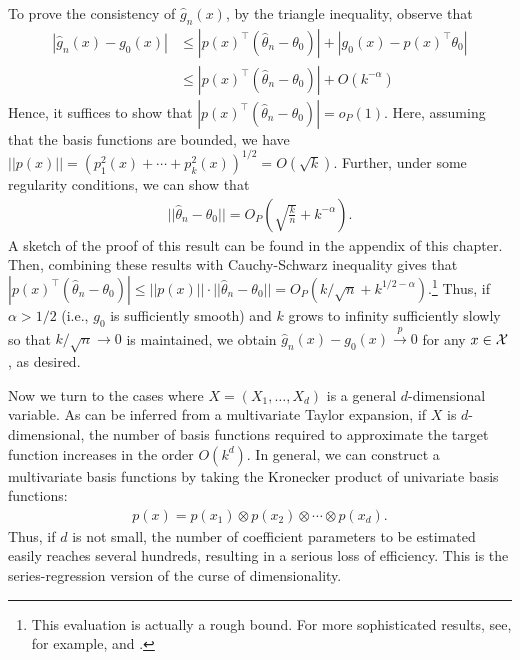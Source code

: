\documentclass[11pt, A4paper, openany, uplatex]{book}
\begin{document}
To prove the consistency of $\hat g_n(x)$, by the triangle inequality, observe that
\begin{align*}
	|\hat g_n(x) - g_0(x)|
	& \le |p(x)^\top (\hat \theta_n - \theta_0)| + |g_0(x) - p(x)^\top \theta_0| \\
	& \le |p(x)^\top (\hat \theta_n - \theta_0)| + O(k^{-\alpha})
\end{align*}
Hence, it suffices to show that $|p(x)^\top (\hat \theta_n - \theta_0)| = o_P(1)$.
Here, assuming that the basis functions are bounded, we have $||p(x)|| = (p_1^2(x) + \cdots + p_k^2(x))^{1/2} = O(\sqrt{k})$.
Further, under some regularity conditions, we can show that
\begin{align}\label{eq:seriesrate}
		||\hat \theta_n - \theta_0|| = O_P\left( \sqrt{\frac{k}{n}} + k^{-\alpha}\right).
\end{align}
A sketch of the proof of this result can be found in the appendix of this chapter.
Then, combining these results with Cauchy-Schwarz inequality gives that $|p(x)^\top (\hat \theta_n - \theta_0)| \le ||p(x)|| \cdot ||\hat \theta_n - \theta_0 || = O_P(k/\sqrt{n} + k^{1/2 - \alpha})$.\footnote{
	This evaluation is actually a rough bound.
	For more sophisticated results, see, for example, \cite{belloni2015some} and \cite{chen2015optimal}.
}
Thus, if $\alpha > 1/2$ (i.e., $g_0$ is sufficiently smooth) and $k$ grows to infinity sufficiently slowly so that $k/\sqrt{n} \to 0$ is maintained, we obtain $\hat g_n(x) - g_0(x) \overset{p}{\to} 0$ for any $x \in \mathcal{X}$, as desired.

\begin{comment}
To prove the asymptotic normality, we require much stronger conditions.
Here, we only state the result under the homoskedasticity assumption $\E[\eps^2 \mid X] = \sigma^2$: for a given $x \in \mcl{X}$,
\begin{align*}
	\frac{\sqrt{n}(\hat m_n(x) - g_0(x))}{\sigma \sqrt{p(x)^\top \E[p(X)p(X)^\top]^{-1}p(x)}} \overset{d}{\to} N(0,1).
\end{align*}
Then, based on this result, we can compute the confidence interval for each $g_0(x)$.
\end{comment}

\bigskip

Now we turn to the cases where $X = (X_1, \ldots, X_d)$ is a general $d$-dimensional variable.
As can be inferred from a multivariate Taylor expansion, if $X$ is $d$-dimensional, the number of basis functions required to approximate the target function increases in the order $O(k^d)$.
In general, we can construct a multivariate basis functions by taking the Kronecker product of univariate basis functions:
\begin{align*}
	p(x) = p(x_1) \otimes p(x_2) \otimes \cdots \otimes p(x_d).
\end{align*}
Thus, if $d$ is not small, the number of coefficient parameters to be estimated easily reaches several hundreds, resulting in a serious loss of efficiency.
This is the series-regression version of the curse of dimensionality.
\end{document}
